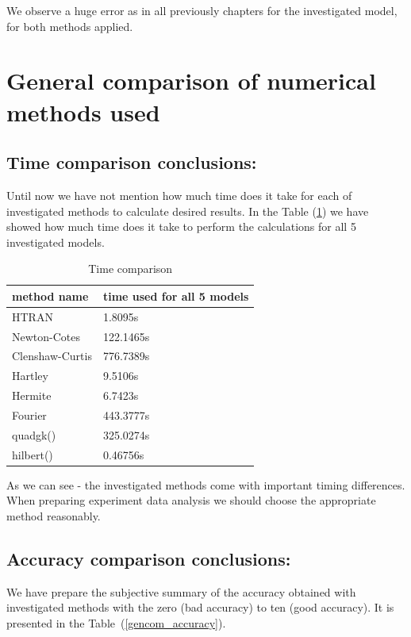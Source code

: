 \documentclass[12pt,twoside,a4paper]{article}
\numberwithin{equation}{subsection}
\numberwithin{figure}{subsection}
\begin{document}
We observe a huge error as in all previously chapters for the investigated model, for both methods applied.

\section{General comparison of numerical methods used} \label{chap:comparison}

\subsection{Time comparison conclusions:} \label{chap:gencom_time}

Until now we have not mention how much time does it take for each of investigated methods to calculate desired results. In the
Table (\ref{gencom_time}) we have showed how much time does it take to perform the calculations for all 5 investigated models.

\begin{table}
  \caption{Time comparison} \label{gencom_time} 
  \begin{tabular}{l l}
    method name  &  time used for all 5 models \\
    \hline
    HTRAN & 1.8095s \\
    Newton-Cotes &  122.1465s \\
    Clenshaw-Curtis & 776.7389s \\
    Hartley & 9.5106s \\
    Hermite & 6.7423s \\
    Fourier & 443.3777s \\
    quadgk() & 325.0274s \\
    hilbert() & 0.46756s \\
    \hline
  \end{tabular}
\end{table} 

As we can see - the investigated methods come with important timing differences. When preparing experiment data analysis we should
choose the appropriate method reasonably.

\subsection{Accuracy comparison conclusions:} \label{chap:gencom_accuracy}

We have prepare the subjective summary of the accuracy obtained with investigated methods with the zero (bad accuracy) to ten
(good accuracy). It is presented in the Table~(\ref{gencom_accuracy}).
\end{document}
